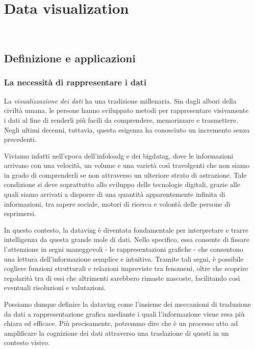 \chapter{Data visualization}
\label{cap:studio_data_viz}
\\

\section{Definizione e applicazioni}
\subsection{La necessità di rappresentare i dati}
La \emph{visualizzazione dei dati} ha una tradizione millenaria. Sin dagli albori della civiltà umana, 
le persone hanno sviluppato metodi per rappresentare visivamente i dati al fine di renderli più facili da comprendere, 
memorizzare e trasmettere.
Negli ultimi decenni, tuttavia, questa esigenza ha conosciuto un incremento senza precedenti.

Viviamo infatti nell'epoca dell'\gls{infoloadg} e dei \gls{bigdatag}, dove le informazioni
arrivano con una velocità, un volume e una varietà così travolgenti che non siamo in grado di comprenderli se non attraverso
un ulteriore strato di astrazione.
Tale condizione si deve soprattutto allo sviluppo delle tecnologie digitali, grazie alle quali siamo arrivati a disporre di una quantità 
apparentemente infinita di informazioni, tra sapere sociale, motori di ricerca e volontà delle persone di esprimersi.

In questo contesto, la \gls{datavizg} è diventata fondamentale per interpretare e trarre intelligenza da questa grande mole di dati.
Nello specifico, essa consente di fissare l'attenzione in segni maneggevoli - le rappresentazioni grafiche - che consentono una lettura dell'informazione
semplice e intuitiva. Tramite tali segni, è possibile cogliere funzioni strutturali e relazioni impreviste tra fenomeni, oltre che scoprire regolarità tra di essi che 
altrimenti sarebbero rimaste nascoste, facilitando così eventuali risoluzioni e valutazioni.

\bigskip
\noindent Possiamo dunque definire la \gls{datavizg} come l'insieme dei meccanismi di traduzione da dati a rappresentazione grafica
mediante i quali l'informazione viene resa più chiara ed efficace. Più precisamente, 
potremmo dire che è un processo atto ad amplificare la cognizione dei dati attraverso
una traslazione di questi in un contesto visivo.


